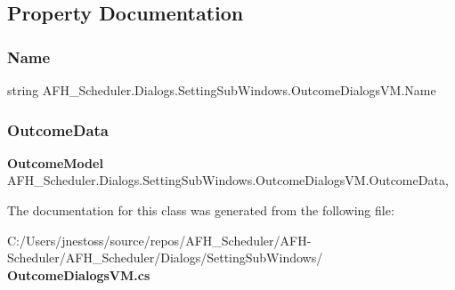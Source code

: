 \subsection{Property Documentation}
\mbox{\label{class_a_f_h___scheduler_1_1_dialogs_1_1_setting_sub_windows_1_1_outcome_dialogs_v_m_a31207b9b083d390ce1b335cf18ae874d}} 
\subsubsection{Name}
{\footnotesize\ttfamily string A\+F\+H\+\_\+\+Scheduler.\+Dialogs.\+Setting\+Sub\+Windows.\+Outcome\+Dialogs\+V\+M.\+Name\hspace{0.3cm}{\ttfamily [get]}}

\mbox{\label{class_a_f_h___scheduler_1_1_dialogs_1_1_setting_sub_windows_1_1_outcome_dialogs_v_m_a32e894f4edd9da60ed3d8f9d93669793}} 
\subsubsection{OutcomeData}
{\footnotesize\ttfamily \textbf{ Outcome\+Model} A\+F\+H\+\_\+\+Scheduler.\+Dialogs.\+Setting\+Sub\+Windows.\+Outcome\+Dialogs\+V\+M.\+Outcome\+Data\hspace{0.3cm}{\ttfamily [get]}, {\ttfamily [set]}}



The documentation for this class was generated from the following file\+:\begin{DoxyCompactItemize}
\item 
C\+:/\+Users/jnestoss/source/repos/\+A\+F\+H\+\_\+\+Scheduler/\+A\+F\+H-\/\+Scheduler/\+A\+F\+H\+\_\+\+Scheduler/\+Dialogs/\+Setting\+Sub\+Windows/\textbf{ Outcome\+Dialogs\+V\+M.\+cs}\end{DoxyCompactItemize}
